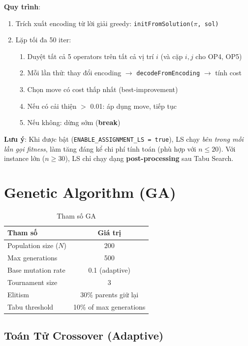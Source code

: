 \documentclass[12pt,a4paper]{article}
\begin{document}
\textbf{Quy trình}:
\begin{enumerate}[nosep]
    \item Trích xuất encoding từ lời giải greedy: \texttt{initFromSolution($\pi$, sol)}
    \item Lặp tối đa 50 iter:
    \begin{enumerate}[nosep]
        \item Duyệt tất cả 5 operators trên tất cả vị trí $i$ (và cặp $i,j$ cho OP4, OP5)
        \item Mỗi lần thử: thay đổi encoding $\to$ \texttt{decodeFromEncoding} $\to$ tính cost
        \item Chọn move có cost thấp nhất (best-improvement)
        \item Nếu có cải thiện $>$ 0.01: áp dụng move, tiếp tục
        \item Nếu không: dừng sớm (\textbf{break})
    \end{enumerate}
\end{enumerate}

\textbf{Lưu ý}: Khi được bật (\texttt{ENABLE\_ASSIGNMENT\_LS = true}), LS chạy \textit{bên trong mỗi lần gọi fitness}, làm tăng đáng kể chi phí tính toán (phù hợp với $n \leq 20$). Với instance lớn ($n \geq 30$), LS chỉ chạy dạng \textbf{post-processing} sau Tabu Search.

\section{Genetic Algorithm (GA)}

\begin{table}[h!]
\centering
\caption{Tham số GA}
\begin{tabular}{lc}
\toprule
\textbf{Tham số} & \textbf{Giá trị} \\
\midrule
Population size ($N$) & 200 \\
Max generations & 500 \\
Base mutation rate & 0.1 (adaptive) \\
Tournament size & 3 \\
Elitism & 30\% parents giữ lại \\
Tabu threshold & 10\% of max generations \\
\bottomrule
\end{tabular}
\end{table}

\subsection{Toán Tử Crossover (Adaptive)}
\end{document}
